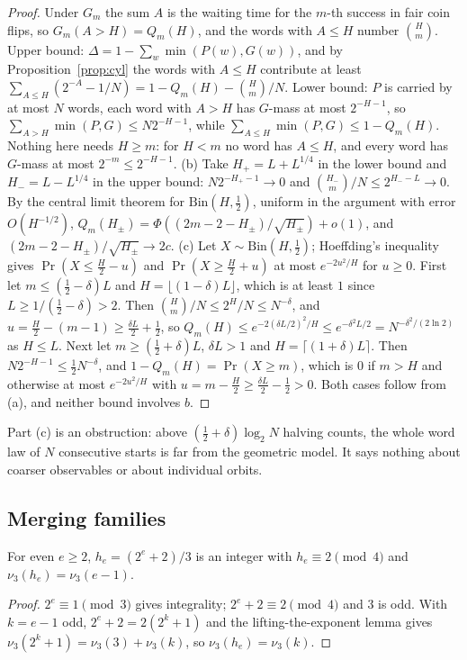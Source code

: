 \begin{proof}
Under $G_m$ the sum $A$ is the waiting time for the $m$-th success in fair coin flips, so $G_m(A>H)=Q_m(H)$, and the words with $A\le H$ number $\binom Hm$.
Upper bound: $\Delta=1-\sum_w\min(P(w),G(w))$, and by Proposition~\ref{prop:cyl} the words with $A\le H$ contribute at least $\sum_{A\le H}(2^{-A}-1/N)=1-Q_m(H)-\binom Hm/N$.
Lower bound: $P$ is carried by at most $N$ words, each word with $A>H$ has $G$-mass at most $2^{-H-1}$, so $\sum_{A>H}\min(P,G)\le N2^{-H-1}$, while $\sum_{A\le H}\min(P,G)\le1-Q_m(H)$. Nothing here needs $H\ge m$: for $H<m$ no word has $A\le H$, and every word has $G$-mass at most $2^{-m}\le2^{-H-1}$.
(b) Take $H_+=L+L^{1/4}$ in the lower bound and $H_-=L-L^{1/4}$ in the upper bound: $N2^{-H_+-1}\to0$ and $\binom{H_-}m/N\le2^{H_--L}\to0$. By the central limit theorem for $\mathrm{Bin}(H,\frac12)$, uniform in the argument with error $O(H^{-1/2})$, $Q_m(H_\pm)=\Phi((2m-2-H_\pm)/\sqrt{H_\pm})+o(1)$, and $(2m-2-H_\pm)/\sqrt{H_\pm}\to2c$.
(c) Let $X\sim\mathrm{Bin}(H,\frac12)$; Hoeffding's inequality gives $\Pr(X\le\frac H2-u)$ and $\Pr(X\ge\frac H2+u)$ at most $e^{-2u^2/H}$ for $u\ge0$. First let $m\le(\frac12-\delta)L$ and $H=\lfloor(1-\delta)L\rfloor$, which is at least $1$ since $L\ge1/(\frac12-\delta)>2$. Then $\binom Hm/N\le2^H/N\le N^{-\delta}$, and $u=\frac H2-(m-1)\ge\frac{\delta L}2+\frac12$, so $Q_m(H)\le e^{-2(\delta L/2)^2/H}\le e^{-\delta^2L/2}=N^{-\delta^2/(2\ln2)}$ as $H\le L$. Next let $m\ge(\frac12+\delta)L$, $\delta L>1$ and $H=\lceil(1+\delta)L\rceil$. Then $N2^{-H-1}\le\frac12N^{-\delta}$, and $1-Q_m(H)=\Pr(X\ge m)$, which is $0$ if $m>H$ and otherwise at most $e^{-2u^2/H}$ with $u=m-\frac H2\ge\frac{\delta L}2-\frac12>0$. Both cases follow from (a), and neither bound involves $b$.
\end{proof}

Part (c) is an obstruction: above $(\frac12+\delta)\log_2N$ halving counts, the whole word law of $N$ consecutive starts is far from the geometric model. It says nothing about coarser observables or about individual orbits.

\subsection{Merging families}

\begin{lemma}\label{lem:nu3}
For even $e\ge2$, $h_e=(2^e+2)/3$ is an integer with $h_e\equiv2\pmod4$ and $\nu_3(h_e)=\nu_3(e-1)$.
\end{lemma}
\begin{proof}
$2^e\equiv1\pmod3$ gives integrality; $2^e+2\equiv2\pmod 4$ and $3$ is odd. With $k=e-1$ odd, $2^e+2=2(2^k+1)$ and the lifting-the-exponent lemma gives $\nu_3(2^k+1)=\nu_3(3)+\nu_3(k)$, so $\nu_3(h_e)=\nu_3(k)$.
\end{proof}


